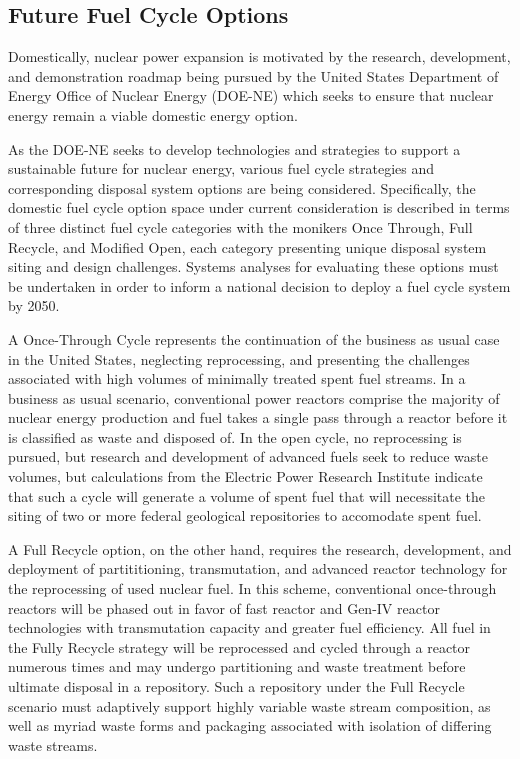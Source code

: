 \subsection{Future Fuel Cycle Options}

Domestically, nuclear power expansion is motivated by the research, 
development, and demonstration roadmap being pursued by the United 
States Department of Energy Office of Nuclear Energy (DOE-NE) which 
seeks to ensure that nuclear energy remain a viable domestic energy 
option.  \cite{DOE-NE_roadmap} 

As the DOE-NE seeks to develop technologies and strategies to support 
a sustainable future for nuclear energy, various fuel cycle strategies 
and corresponding disposal system options are being considered.  
Specifically, the domestic fuel cycle option space under current 
consideration is described in terms of three distinct fuel cycle 
categories with the monikers Once Through, Full Recycle, and Modified 
Open, each category presenting unique disposal system siting and 
design challenges. Systems analyses for evaluating these options must 
be undertaken in order to inform a national decision to deploy a fuel 
cycle system by 2050. \cite{DOE-NE_roadmap} 

A Once-Through Cycle represents the continuation of the business as 
usual case in the United States,  neglecting reprocessing, and 
presenting the challenges associated with high volumes of minimally 
treated spent fuel streams.  In a business as usual scenario, 
conventional power reactors comprise the majority of nuclear energy 
production and fuel takes a single pass through a reactor before it is 
classified as waste and disposed of. In the open cycle, no 
reprocessing is pursued, but research and development of advanced 
fuels seek to reduce waste volumes, but calculations from the Electric 
Power Research Institute indicate that such a cycle will generate a 
volume of spent fuel that will necessitate the siting of two or more 
federal  geological repositories to accomodate spent fuel.  
\cite{Room_at_the_mountain} 

A Full Recycle option, on the other hand, requires the research, 
development, and deployment of partititioning, transmutation, and 
advanced reactor technology for the reprocessing of used nuclear fuel.  
In this scheme, conventional once-through reactors will be phased out 
in favor of fast reactor and Gen-IV reactor technologies with 
transmutation capacity and greater fuel efficiency. All fuel in the 
Fully Recycle strategy will be reprocessed and cycled through a 
reactor numerous times and may undergo partitioning and waste 
treatment before ultimate disposal in a repository. Such a repository 
under the Full Recycle scenario must adaptively support highly 
variable waste stream composition, as well as myriad waste forms and 
packaging associated with isolation of differing waste streams.

